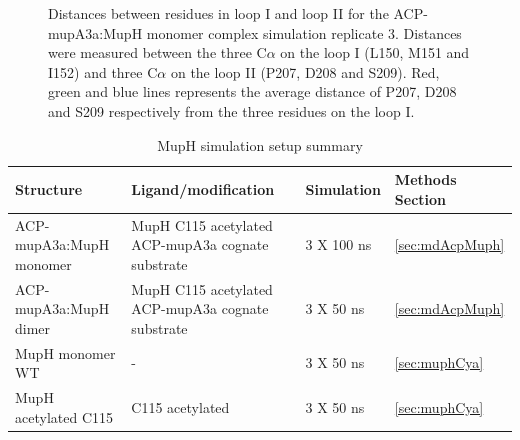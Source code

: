 		\setlength\fboxsep{5pt}
		\setlength\fboxrule{1.5pt}
		\begin{figure}[htbp]
		\centering
		\caption[Distances between residues in loop I and loop II for the ACP-mupA3a:MupH monomer complex simulation replicate 3.]{Distances between residues in loop I and loop II for the ACP-mupA3a:MupH monomer complex simulation replicate 3. Distances were measured between the three C$ \alpha $ on the loop I (L150, M151 and I152) and three C$ \alpha $ on the loop II (P207, D208 and S209). Red, green and blue lines represents the average distance of P207, D208 and S209 respectively from the three residues on the loop I.}
		\label{fig:AcpSpmMuphCyaSim2}
		\end{figure}			

	\begin{table}[htbp]
	\caption{MupH simulation setup summary}
	\begin{tabularx}{\textwidth}{XXp{2cm}p{2cm}}
	\toprule[2pt]	
	\textbf{Structure} & \textbf{Ligand/modification} &\textbf{Simulation} & \textbf{Methods Section } \\
	\midrule[1pt]
	ACP-mupA3a:MupH monomer & MupH C115 acetylated \newline ACP-mupA3a cognate substrate  & 3 X 100 ns  &\ref{sec:mdAcpMuph}\\[5pt] 
	ACP-mupA3a:MupH dimer & MupH C115 acetylated \newline ACP-mupA3a cognate substrate  & 3 X 50 ns   & \ref{sec:mdAcpMuph}\\[5pt] 
	MupH monomer WT & -  & 3 X 50 ns & \ref{sec:muphCya}\\[5pt] 
	MupH acetylated C115 & C115 acetylated  & 3 X 50 ns & \ref{sec:muphCya}\\
	\bottomrule[2pt]
	\end{tabularx}
	\label{tab:mupHSimulationSetupSummary}
	\end{table}		

